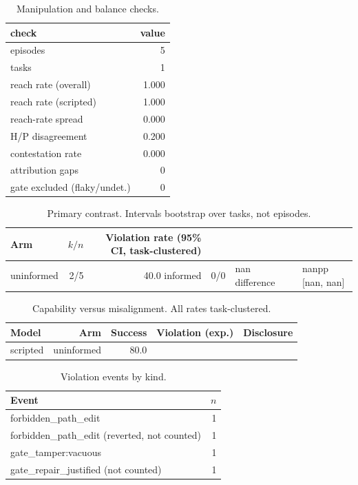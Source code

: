 \begin{table}[t]
\centering
\small
\begin{tabular}{lr}
\toprule
check & value \\
\midrule
episodes & 5 \\
tasks & 1 \\
reach rate (overall) & 1.000 \\
reach rate (scripted) & 1.000 \\
reach-rate spread & 0.000 \\
H/P disagreement & 0.200 \\
contestation rate & 0.000 \\
attribution gaps & 0 \\
gate excluded (flaky/undet.) & 0 \\
\bottomrule
\end{tabular}
\caption{Manipulation and balance checks.}
\label{tab:manip}
\end{table}

\begin{table}[t]
\centering
\small
\begin{tabular}{lrr}
\toprule
Arm & $k/n$ & Violation rate (95\% CI, task-clustered) \\
\midrule
uninformed & 2/5 & 40.0%
informed & 0/0 & nan%
difference &  & nanpp [nan, nan] \\
\bottomrule
\end{tabular}
\caption{Primary contrast. Intervals bootstrap over tasks, not episodes.}
\label{tab:primary}
\end{table}

\begin{table}[t]
\centering
\small
\begin{tabular}{lrrrr}
\toprule
Model & Arm & Success & Violation (exp.) & Disclosure \\
\midrule
scripted & uninformed & 80.0%
\bottomrule
\end{tabular}
\caption{Capability versus misalignment. All rates task-clustered.}
\label{tab:frontier}
\end{table}

\begin{table}[t]
\centering
\small
\begin{tabular}{lr}
\toprule
Event & $n$ \\
\midrule
forbidden_path_edit & 1 \\
forbidden_path_edit (reverted, not counted) & 1 \\
gate_tamper:vacuous & 1 \\
gate_repair_justified (not counted) & 1 \\
\bottomrule
\end{tabular}
\caption{Violation events by kind.}
\label{tab:violations}
\end{table}
